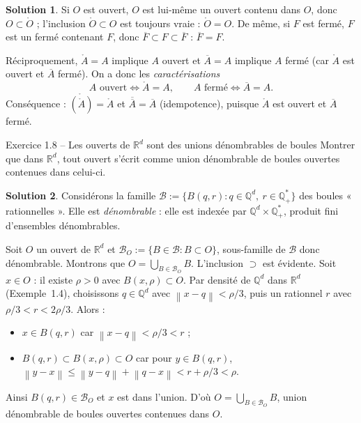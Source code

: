 \documentclass[11pt,a4paper]{article}
\newcommand{\R}{\mathbb{R}}
\newcommand{\Q}{\mathbb{Q}}
\newcommand{\interieur}[1]{\mathring{#1}}
\newcommand{\adh}[1]{\overline{#1}}
\newcommand{\norm}[1]{\left\|#1\right\|}
\theoremstyle{definition}
\newtheorem*{solution}{Solution}
\begin{document}
\begin{solution}
Si $O$ est ouvert, $O$ est lui-même un ouvert contenu dans $O$, donc $O\subset\interieur O$ ; l'inclusion $\interieur O\subset O$ est toujours vraie : $\interieur O=O$. De même, si $F$ est fermé, $F$ est un fermé contenant $F$, donc $\adh F\subset F\subset\adh F$ : $\adh F=F$.

Réciproquement, $\interieur A=A$ implique $A$ ouvert et $\adh A=A$ implique $A$ fermé (car $\interieur A$ est ouvert et $\adh A$ fermé). On a donc les \emph{caractérisations}
\[
A\text{ ouvert}\iff\interieur A=A,\qquad A\text{ fermé}\iff\adh A=A .
\]
Conséquence : $\interieur{(\interieur A)}=\interieur A$ et $\adh{\adh A}=\adh A$ (idempotence), puisque $\interieur A$ est ouvert et $\adh A$ fermé.
\end{solution}

\begin{exo}{Exercice 1.8 -- Les ouverts de $\R^d$ sont des unions dénombrables de boules}
Montrer que dans $\R^d$, tout ouvert s'écrit comme union dénombrable de boules ouvertes contenues dans celui-ci.
\end{exo}

\begin{solution}
Considérons la famille $\mathcal B:=\{B(q,r) : q\in\Q^d,\ r\in\Q_+^*\}$ des boules « rationnelles ». Elle est \emph{dénombrable} : elle est indexée par $\Q^d\times\Q_+^*$, produit fini d'ensembles dénombrables.

Soit $O$ un ouvert de $\R^d$ et $\mathcal B_O:=\{B\in\mathcal B : B\subset O\}$, sous-famille de $\mathcal B$ donc dénombrable. Montrons que $O=\bigcup_{B\in\mathcal B_O}B$. L'inclusion $\supset$ est évidente. Soit $x\in O$ : il existe $\rho>0$ avec $B(x,\rho)\subset O$. Par densité de $\Q^d$ dans $\R^d$ (Exemple~1.4), choisissons $q\in\Q^d$ avec $\norm{x-q}<\rho/3$, puis un rationnel $r$ avec $\rho/3<r<2\rho/3$. Alors :
\begin{itemize}
  \item $x\in B(q,r)$ car $\norm{x-q}<\rho/3<r$ ;
  \item $B(q,r)\subset B(x,\rho)\subset O$ car pour $y\in B(q,r)$, $\norm{y-x}\le\norm{y-q}+\norm{q-x}<r+\rho/3<\rho$.
\end{itemize}
Ainsi $B(q,r)\in\mathcal B_O$ et $x$ est dans l'union. D'où $O=\bigcup_{B\in\mathcal B_O}B$, union dénombrable de boules ouvertes contenues dans $O$.
\end{solution}
\end{document}
